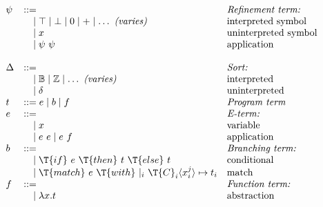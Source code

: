 \documentclass[10pt,preprint]{sigplanconf-pldi16}
\theoremstyle{definition}
\newcommand{\App}[2]{{#1}\ {#2}}
\begin{document}
\begin{figure}
\small
$$
\begin{array}{llll}
\psi &::=                                                                                   & \text{\emph{Refinement term:}}\\
  &\quad   \mid \top \mid \bot \mid 0 \mid + \mid \ldots\ \text{\emph{(varies)}}            & \text{interpreted symbol}\\
  &\quad   \mid x                                                                           & \text{uninterpreted symbol}\\
  &\quad   \mid \App{\psi}{\psi}                                                            & \text{application}\\
\\
\Delta &::=                                                                                 & \text{\emph{Sort:}}\\
  &\quad   \mid \mathbb{B} \mid \mathbb{Z}\mid \ldots\ \text{\emph{(varies)}}               & \text{interpreted}\\ 
  &\quad   \mid \delta                                                                      & \text{uninterpreted}\\
t &::= e \mid b \mid f                                                                      & \text{\emph{Program term}}\\  
e &::=                                                                                      & \text{\emph{E-term:}}\\
  &\quad   \mid x                                                                           & \text{variable}\\
  &\quad   \mid \App{e}{e} \mid \App{e}{f}                                                  & \text{application}\\
b &::=                                                                                      & \text{\emph{Branching term:}}\\
  &\quad   \mid \T{if}\ e\ \T{then}\ t\ \T{else}\ t                                         & \text{conditional}\\
  &\quad   \mid \T{match}\ e\ \T{with}\ |_i\ \T{C}_i \langle x_i^j\rangle \mapsto t_i       & \text{match}\\
f &::=                                                                                      & \text{\emph{Function term:}}\\
  &\quad   \mid \lambda x.t                                                                 & \text{abstraction}\\

\end{array}$$
\end{figure}
\end{document}
